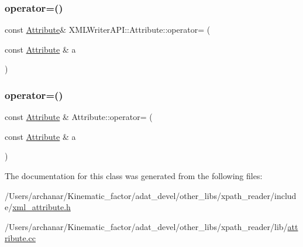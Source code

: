 \mbox{\label{classXMLWriterAPI_1_1Attribute_a073917fc63e79e3f44d26c8a689d40e4}} 
\subsubsection{\texorpdfstring{operator=()}{operator=()}\hspace{0.1cm}{\footnotesize\ttfamily [1/2]}}
{\footnotesize\ttfamily const \mbox{\hyperlink{classXMLWriterAPI_1_1Attribute}{Attribute}}\& X\+M\+L\+Writer\+A\+P\+I\+::\+Attribute\+::operator= (\begin{DoxyParamCaption}\item[{const \mbox{\hyperlink{classXMLWriterAPI_1_1Attribute}{Attribute}} \&}]{a }\end{DoxyParamCaption})}

\mbox{\label{classXMLWriterAPI_1_1Attribute_a66481b41867b83a48b65a63165a7bcd9}} 
\subsubsection{\texorpdfstring{operator=()}{operator=()}\hspace{0.1cm}{\footnotesize\ttfamily [2/2]}}
{\footnotesize\ttfamily const \mbox{\hyperlink{classXMLWriterAPI_1_1Attribute}{Attribute}} \& Attribute\+::operator= (\begin{DoxyParamCaption}\item[{const \mbox{\hyperlink{classXMLWriterAPI_1_1Attribute}{Attribute}} \&}]{a }\end{DoxyParamCaption})}



The documentation for this class was generated from the following files\+:\begin{DoxyCompactItemize}
\item 
/\+Users/archanar/\+Kinematic\+\_\+factor/adat\+\_\+devel/other\+\_\+libs/xpath\+\_\+reader/include/\mbox{\hyperlink{other__libs_2xpath__reader_2include_2xml__attribute_8h}{xml\+\_\+attribute.\+h}}\item 
/\+Users/archanar/\+Kinematic\+\_\+factor/adat\+\_\+devel/other\+\_\+libs/xpath\+\_\+reader/lib/\mbox{\hyperlink{attribute_8cc}{attribute.\+cc}}\end{DoxyCompactItemize}
